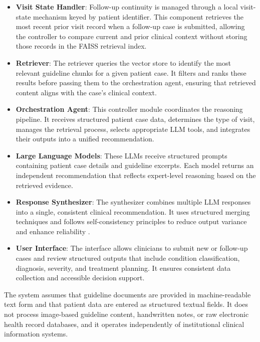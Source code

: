 \documentclass[preprint,12pt]{elsarticle}
\begin{document}
\begin{itemize}
\item \textbf{Visit State Handler}: Follow-up continuity is managed through a local visit-state mechanism keyed by patient identifier. This component retrieves the most recent prior visit record when a follow-up case is submitted, allowing the controller to compare current and prior clinical context without storing those records in the FAISS retrieval index.

\item \textbf{Retriever}: The retriever queries the vector store to identify the most relevant guideline chunks for a given patient case. It filters and ranks these results before passing them to the orchestration agent, ensuring that retrieved content aligns with the case's clinical context.

\item \textbf{Orchestration Agent}: This controller module coordinates the reasoning pipeline. It receives structured patient case data, determines the type of visit, manages the retrieval process, selects appropriate LLM tools, and integrates their outputs into a unified recommendation.

\item \textbf{Large Language Models}: These LLMs receive structured prompts containing patient case details and guideline excerpts. Each model returns an independent recommendation that reflects expert-level reasoning based on the retrieved evidence.

\item \textbf{Response Synthesizer}: The synthesizer combines multiple LLM responses into a single, consistent clinical recommendation. It uses structured merging techniques and follows self-consistency principles to reduce output variance and enhance reliability \cite{r8}.

\item \textbf{User Interface}: The interface allows clinicians to submit new or follow-up cases and review structured outputs that include condition classification, diagnosis, severity, and treatment planning. It ensures consistent data collection and accessible decision support.

\end{itemize}

The system assumes that guideline documents are provided in machine-readable text form and that patient data are entered as structured textual fields. It does not process image-based guideline content, handwritten notes, or raw electronic health record databases, and it operates independently of institutional clinical information systems.
\end{document}
